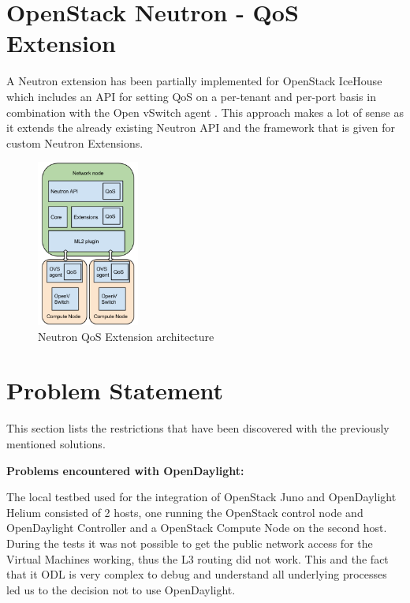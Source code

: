 \section{OpenStack Neutron - QoS Extension}

A Neutron extension has been partially implemented for OpenStack IceHouse which includes an API for setting QoS on a per-tenant and per-port basis in combination with the Open vSwitch agent \cite{neutron-qos}. This approach makes a lot of sense as it extends the already existing Neutron API and the framework that is given for custom Neutron Extensions.



\begin{figure}[H]
\centering
\includegraphics[width=0.3\textwidth]{images/sota/neutron_qos_extension.png}
\caption{Neutron QoS Extension architecture}
\end{figure}



\section{Problem Statement}

This section lists the restrictions that have been discovered with the previously mentioned solutions. 


\textbf{Problems encountered with OpenDaylight:}

The local testbed used for the integration of OpenStack Juno and OpenDaylight Helium consisted of 2 hosts, one running the OpenStack control node and OpenDaylight Controller and a OpenStack Compute Node on the second host. During the tests it was not possible to get the public network access for the Virtual Machines working, thus the L3 routing did not work. This and the fact that it ODL is very complex to debug and understand all underlying processes led us to the decision not to use OpenDaylight.


